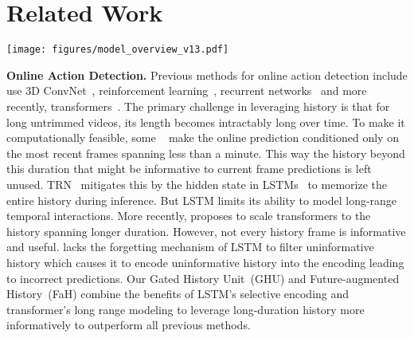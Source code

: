 \documentclass[10pt,twocolumn,letterpaper]{article}
\newcommand{\methodname}{GateHUB}
\begin{document}
%
 \section{Related Work}
\begin{figure*}[t]
\begin{center}
\texttt{[image: figures/model\_overview\_v13.pdf]}
\end{center}
\vspace{-1.5em}
\caption{{\bf Model Overview.} \methodname~comprises a novel Gated History Unit~(GHU)~(a) as part of History Encoder~(b) to explicitly enhance or suppress history frames, \ie streaming video frames observed so far, as per how informative they are to current frame prediction. GHU encodes them by cross-attending with a latent encoding~(Q). \methodname~uses Future-augmented History features~(FaH)~(d) to encode each history frame using  subsequently observed future frames. The Present Decoder~(c) correlates with history by cross-attending the encoded history with the present, \ie, a small set of most recent frames, to make current frame prediction. We subject the prediction to a background suppression loss~(e) to reduce false positives by effectively separating action frames from closely resembling background frames.} 
\label{fig:gatehub_model}
\vspace{-1em}
\end{figure*}



{\noindent \bf Online Action Detection.} 
Previous methods for online action detection include use 3D ConvNet~\cite{de2016online}, reinforcement learning~\cite{gao2017red}, recurrent networks~\cite{xu2019temporal, eun2020learning, qu2020lap, gao2020woad,zhao2020privileged,qu2020lap} and more recently, transformers~\cite{wang2021oadtr, xu2021long}. The primary challenge in leveraging history is that for long untrimmed videos, its length becomes intractably long over time. To make it computationally feasible, some ~\cite{eun2020learning, wang2021oadtr, gao2020woad,qu2020lap} make the online prediction conditioned only on the most recent frames spanning less than a minute. This way the history beyond 
this duration 
that might be informative to current frame predictions is left unused. 
TRN~\cite{xu2019temporal} mitigates this by the hidden state in LSTMs~\cite{hochreiter1997long} to memorize the entire history during inference.
But LSTM limits its ability to model long-range temporal interactions. More recently, \cite{xu2021long} proposes to scale transformers to the history spanning longer duration.
However, not every history frame is informative and useful. \cite{xu2021long} lacks the forgetting mechanism of LSTM to filter uninformative history which causes it to encode uninformative history into the encoding leading to incorrect predictions. Our Gated History Unit~(GHU) and Future-augmented History~(FaH) combine the benefits of LSTM's selective encoding and transformer's long range modeling to leverage long-duration history more informatively to outperform all previous methods. 
\end{document}
